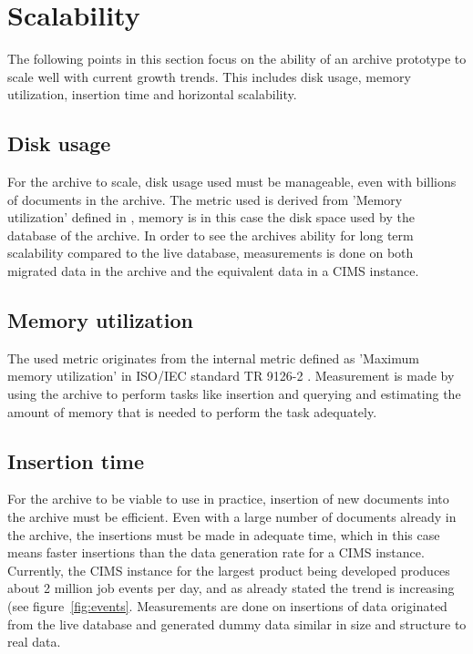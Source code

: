 \section{Scalability}
The following points in this section focus on the ability of an archive prototype to scale well with current growth trends. This includes disk usage, memory utilization, insertion time and horizontal scalability.

\subsection{Disk usage}
For the archive to scale, disk usage used must be manageable, even with billions of documents in the archive. The metric used is derived from 'Memory utilization' defined in \cite{isoInternalMetric}, memory is in this case the disk space used by the database of the archive. In order to see the archives ability for long term scalability compared to the live database, measurements is done on both migrated data in the archive and the equivalent data in a CIMS instance.

\subsection{Memory utilization}
The used metric originates from the internal metric defined as 'Maximum memory utilization' in ISO/IEC standard TR 9126-2 \cite{isoExternalMetric}. Measurement is made by using the archive to perform tasks like insertion and querying and estimating the amount of memory that is needed to perform the task adequately. 

\subsection{Insertion time}
For the archive to be viable to use in practice, insertion of new documents into the archive must be efficient. Even with a large number of documents already in the archive, the insertions must be made in adequate time, which in this case means faster insertions than the data generation rate for a CIMS instance. Currently, the CIMS instance for the largest product being developed produces about 2 million job events per day, and as already stated the trend is increasing (see figure~\ref{fig:events}.
Measurements are done on insertions of data originated from the live database and generated dummy data similar in size and structure to real data.

